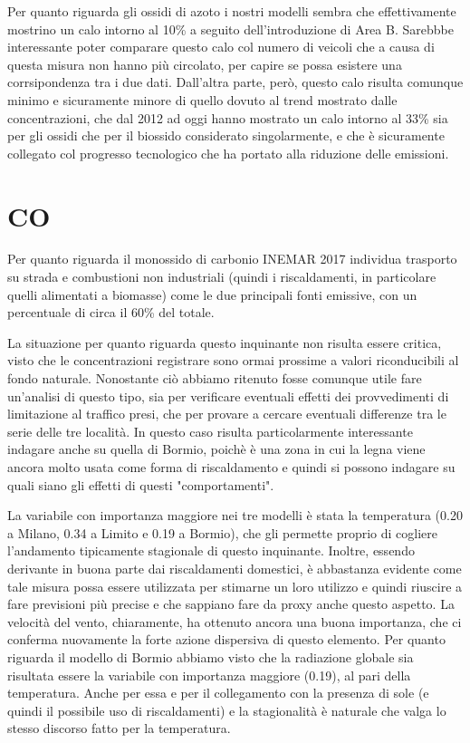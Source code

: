 \documentclass[a4paper,12pt]{report}
\begin{document}
Per quanto riguarda gli ossidi di azoto i nostri modelli sembra che effettivamente mostrino un calo intorno al 10\% a seguito dell'introduzione di Area B. Sarebbbe interessante poter comparare questo calo col numero di veicoli che a causa di questa misura non hanno più circolato, per capire se possa esistere una corrsipondenza tra i due dati. Dall'altra parte, però, questo calo risulta comunque minimo e sicuramente minore di quello dovuto al trend mostrato dalle concentrazioni, che dal 2012 ad oggi hanno mostrato un calo intorno al 33\% sia per gli ossidi che per il biossido considerato singolarmente, e che è sicuramente collegato col progresso tecnologico che ha portato alla riduzione delle emissioni.

\section{CO}
Per quanto riguarda il monossido di carbonio INEMAR 2017 individua trasporto su strada e combustioni non industriali (quindi i riscaldamenti, in particolare quelli alimentati a biomasse) come le due principali fonti emissive, con un percentuale di circa il 60\% del totale.

La situazione per quanto riguarda questo inquinante non risulta essere critica, visto che le concentrazioni registrare sono ormai prossime a valori riconducibili al fondo naturale. Nonostante ciò abbiamo ritenuto fosse comunque utile fare un'analisi di questo tipo, sia per verificare eventuali effetti dei provvedimenti di limitazione al traffico presi, che per provare a cercare eventuali differenze tra le serie delle tre località. In questo caso risulta particolarmente interessante indagare anche su quella di Bormio, poichè è una zona in cui la legna viene ancora molto usata come forma di riscaldamento e quindi si possono indagare su quali siano gli effetti di questi "comportamenti".

La variabile con importanza maggiore nei tre modelli è stata la temperatura (0.20 a Milano, 0.34 a Limito e 0.19 a Bormio), che gli permette proprio di cogliere l'andamento tipicamente stagionale di questo inquinante. Inoltre, essendo derivante in buona parte dai riscaldamenti domestici, è abbastanza evidente come tale misura possa essere utilizzata per stimarne un loro utilizzo e quindi riuscire a fare previsioni più precise e che sappiano fare da proxy anche questo aspetto.
La velocità del vento, chiaramente, ha ottenuto ancora una buona importanza, che ci conferma nuovamente la forte azione dispersiva di questo elemento.
Per quanto riguarda il modello di Bormio abbiamo visto che la radiazione globale sia risultata essere la variabile con importanza maggiore (0.19), al pari della temperatura. Anche per essa e per il collegamento con la presenza di sole (e quindi il possibile uso di riscaldamenti) e la stagionalità è naturale che valga lo stesso discorso fatto per la temperatura.
\end{document}
